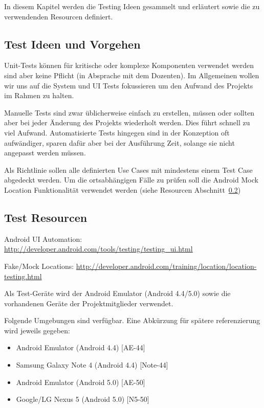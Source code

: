 In diesem Kapitel werden die Testing Ideen gesammelt und erläutert sowie die zu verwendenden Resourcen definiert.

\subsection{Test Ideen und Vorgehen}
Unit-Tests können für kritische oder komplexe Komponenten verwendet werden sind aber keine Pflicht (in Absprache mit dem Dozenten). 
Im Allgemeinen wollen wir uns auf die System und UI Tests fokussieren um den Aufwand des Projekts im Rahmen zu halten.

\medskip
Manuelle Tests sind zwar üblicherweise einfach zu erstellen, müssen oder sollten aber bei jeder Änderung des Projekts wiederholt werden. Dies führt schnell zu viel Aufwand. 
Automatisierte Tests hingegen sind in der Konzeption oft aufwändiger, sparen dafür aber bei der Ausführung Zeit, solange sie nicht angepasst werden müssen.

\medskip
Als Richtlinie sollen alle definierten Use Cases mit mindestens einem Test Case abgedeckt werden. 
Um die ortsabhängigen Fälle zu prüfen soll die Android Mock Location Funktionalität verwendet werden (siehe Resourcen Abschnitt~\ref{sec:test_resources})

\subsection{Test Resourcen}
\label{sec:test_resources}
Android UI Automation: \url{http://developer.android.com/tools/testing/testing_ui.html}

Fake/Mock Locations: \url{http://developer.android.com/training/location/location-testing.html}

\medskip

Als Test-Geräte wird der Android Emulator (Android 4.4/5.0) sowie die vorhandenen Geräte der Projektmitglieder verwendet. 

\medskip
Folgende Umgebungen sind verfügbar. Eine Abkürzung für spätere referenzierung wird jeweils gegeben:

\begin{itemize}
\item Android Emulator (Android 4.4) [AE-44]
\item Samsung Galaxy Note 4 (Android 4.4) [Note-44]
\item Android Emulator (Android 5.0) [AE-50]
\item Google/LG Nexus 5 (Android 5.0) [N5-50]
\end{itemize}

